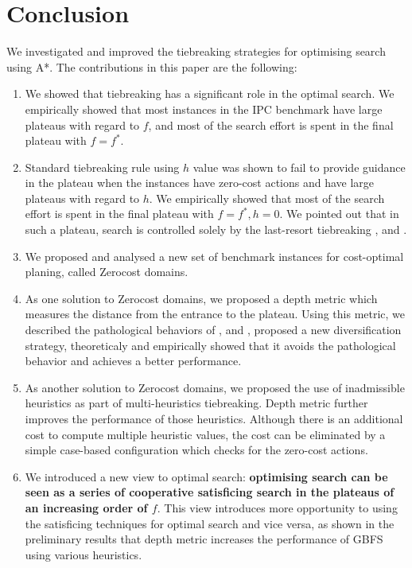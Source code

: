 
\section{Conclusion}

We investigated and improved the tiebreaking strategies for optimising search using A*.
The contributions in this paper are the following:

\begin{enumerate}
 \item We showed that tiebreaking has a significant role in the optimal
       search. We empirically showed that most instances in the IPC
       benchmark have large plateaus with regard to $f$, and most of the
       search effort is spent in the final plateau with $f=f^*$.
 \item Standard tiebreaking rule using $h$ value was shown to fail to
       provide guidance in the plateau when the instances have zero-cost
       actions and have large plateaus with regard to $h$.
       We empirically showed that most of the search effort is spent in
       the final plateau with $f=f^*, h=0$. We pointed out that in such
       a plateau, search is controlled solely by the
       last-resort tiebreaking \fifo, \lifo and \ro.
 \item We proposed and analysed a new set of benchmark
       instances for cost-optimal planing, called Zerocost domains.
 \item As one solution to Zerocost domains, we proposed a depth metric
       which measures the distance from the entrance to the
       plateau. Using this metric, we described the pathological
       behaviors of \fifo, \lifo and \ro, proposed a new diversification
       strategy, theoreticaly and empirically showed that it avoids the
       pathological behavior and achieves a better performance.
 \item As another solution to Zerocost domains, we proposed the use of
       inadmissible heuristics as part of multi-heuristics tiebreaking.
       Depth metric further improves the performance of those
       heuristics. Although there is an additional cost to compute
       multiple heuristic values, the cost can be eliminated by a simple
       case-based configuration which checks for the zero-cost actions.
 \item We introduced a new view to optimal \astar search:
       \textbf{optimising search can be seen as a series of cooperative
       satisficing search in the plateaus of an increasing order of
       $f$}. This view introduces more opportunity to using the
       satisficing techniques for optimal search and vice versa, as
       shown in the preliminary results that depth metric increases the
       performance of GBFS using various heuristics.
\end{enumerate}

